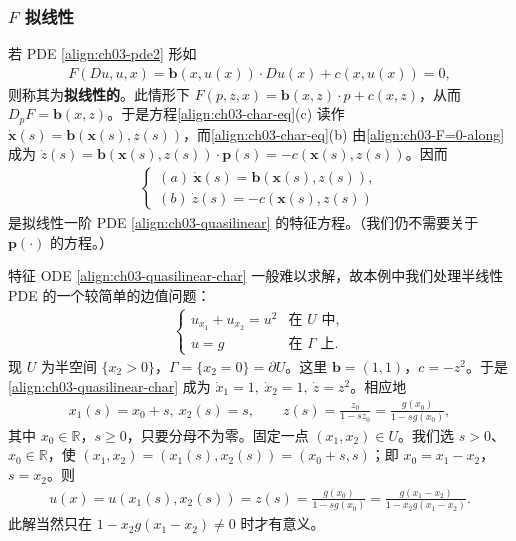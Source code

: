 \documentclass[../../main.tex]{subfiles}
\begin{document}
\subsubsection{$F$ 拟线性}

若 PDE \eqref{align:ch03-pde2} 形如
\begin{align}\label{align:ch03-quasilinear}
F(Du,u,x)=\mathbf{b}(x,u(x))\cdot Du(x)+c(x,u(x))=0,
\end{align}
则称其为\textbf{拟线性的}。此情形下 $F(p,z,x)=\mathbf{b}(x,z)\cdot p+c(x,z)$，从而 $D_p F=\mathbf{b}(x,z)$。于是方程\eqref{align:ch03-char-eq}(c) 读作 $\dot{\mathbf{x}}(s)=\mathbf{b}(\mathbf{x}(s),z(s))$，而\eqref{align:ch03-char-eq}(b) 由\eqref{align:ch03-F=0-along} 成为 $\dot{z}(s)=\mathbf{b}(\mathbf{x}(s),z(s))\cdot\mathbf{p}(s)=-c(\mathbf{x}(s),z(s))$。因而
\begin{align}\label{align:ch03-quasilinear-char}
\begin{cases}
(a)\ \dot{\mathbf{x}}(s)=\mathbf{b}(\mathbf{x}(s),z(s)),\\
(b)\ \dot{z}(s)=-c(\mathbf{x}(s),z(s))
\end{cases}
\end{align}
是拟线性一阶 PDE \eqref{align:ch03-quasilinear} 的特征方程。（我们仍不需要关于 $\mathbf{p}(\cdot)$ 的方程。）

\begin{example}\label{example:ch03-semi}
特征 ODE \eqref{align:ch03-quasilinear-char} 一般难以求解，故本例中我们处理半线性 PDE 的一个较简单的边值问题：
\begin{align}\label{align:ch03-semi-ex}
\begin{cases}
u_{x_1}+u_{x_2}=u^2 & \text{在 }U\text{ 中},\\
u=g & \text{在 }\Gamma\text{ 上}.
\end{cases}
\end{align}
现 $U$ 为半空间 $\{x_2>0\}$，$\Gamma=\{x_2=0\}=\partial U$。这里 $\mathbf{b}=(1,1)$，$c=-z^2$。于是\eqref{align:ch03-quasilinear-char} 成为 $\dot{x}_1=1,\ \dot{x}_2=1,\ \dot{z}=z^2$。相应地
\begin{align*}
x_1(s)=x_0+s,\ x_2(s)=s,\qquad z(s)=\frac{z_0}{1-sz_0}=\frac{g(x_0)}{1-sg(x_0)},
\end{align*}
其中 $x_0\in\mathbb{R}$，$s\geqslant 0$，只要分母不为零。固定一点 $(x_1,x_2)\in U$。我们选 $s>0$、$x_0\in\mathbb{R}$，使 $(x_1,x_2)=(x_1(s),x_2(s))=(x_0+s,s)$；即 $x_0=x_1-x_2$，$s=x_2$。则
\begin{align*}
u(x)=u(x_1(s),x_2(s))=z(s)=\frac{g(x_0)}{1-sg(x_0)}=\frac{g(x_1-x_2)}{1-x_2 g(x_1-x_2)}.
\end{align*}
此解当然只在 $1-x_2 g(x_1-x_2)\neq 0$ 时才有意义。
\end{example}
\end{document}
